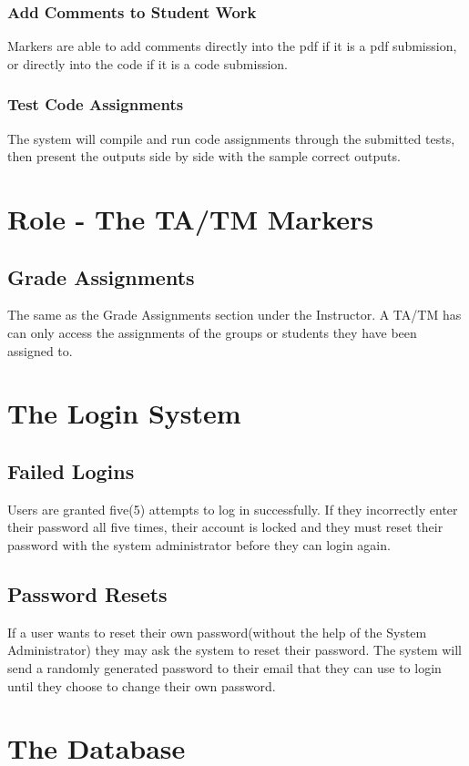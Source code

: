 \documentclass{article}
\begin{document}
\subsubsection{Add Comments to Student Work}
Markers are able to add comments directly into the pdf if it is a pdf submission,
or directly into the code if it is a code submission.
\subsubsection{Test Code Assignments}
The system will compile and run code assignments through the submitted tests,
then present the outputs side by side with the sample correct outputs.

\section{Role - The TA/TM Markers \label{Marker}}
\subsection{Grade Assignments}
The same as the Grade Assignments section under the Instructor.
A TA/TM has can only access the assignments of the groups or students they
have been assigned to.

\section{The Login System}
\subsection{Failed Logins}
Users are granted five(5) attempts to log in successfully.  If they incorrectly enter their password all five times, their account is locked and they must reset their password with the system administrator before they can login again.
\subsection{Password Resets}
If a user wants to reset their own password(without the help of the System Administrator) they may ask the system to reset their password.  The system will send a randomly generated password to their email that they can use to login until they choose to change their own password.

\section{The Database}
\end{document}
